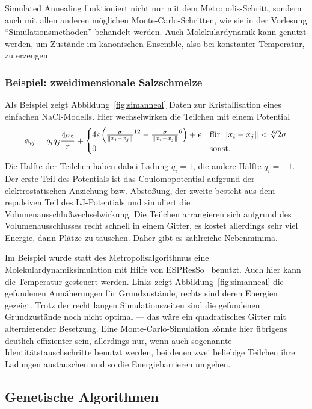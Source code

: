 Simulated Annealing funktioniert nicht nur mit dem
Metropolis-Schritt, sondern auch mit allen anderen möglichen
Monte-Carlo-Schritten, wie sie in der Vorlesung
"`Simulationsmethoden"' behandelt werden. Auch Molekulardynamik kann
genutzt werden, um Zustände im kanonischen Ensemble, also bei
konstanter Temperatur, zu erzeugen.

\subsubsection{Beispiel: zweidimensionale Salzschmelze}
Als Beispiel zeigt Abbildung~\ref{fig:simanneal} Daten zur
Kristallisation eines einfachen NaCl-Modells. Hier wechselwirken die
Teilchen mit einem Potential
\begin{equation}
  \phi_{ij} = q_iq_j\frac{4\sigma\epsilon}{r}  +
  \begin{cases}
    4\epsilon\left(\frac{\sigma}{\left\lVert{x_i-x_j}\right\rVert}^{12} -
      \frac{\sigma}{\left\lVert{x_i-x_j}\right\rVert}^{6}\right) + \epsilon
    & \text{für}\; \left\lVert{x_i-x_j}\right\rVert < \sqrt[6]{2}\sigma\\
    0 & \text{sonst}.
  \end{cases}
\end{equation}
Die Hälfte der Teilchen haben dabei Ladung $q_i=1$, die andere Hälfte
$q_i=-1$. Der erste Teil des Potentials ist das Coulombpotential
aufgrund der elektrostatischen Anziehung bzw. Abstoßung, der zweite
besteht aus dem repulsiven Teil des LJ-Potentials und simuliert die
Volumenausschlußwechselwirkung. Die Teilchen arrangieren sich aufgrund
des Volumenausschlusses recht schnell in einem Gitter, es kostet
allerdings sehr viel Energie, dann Plätze zu tauschen. Daher gibt es
zahlreiche Nebenminima.

Im Beispiel wurde statt des Metropolisalgorithmus eine
Molekulardynamiksimulation mit Hilfe von ESPResSo~\cite{espresso}
benutzt. Auch hier kann die Temperatur gesteuert werden. Links zeigt
Abbildung~\ref{fig:simanneal} die gefundenen Annäherungen für
Grundzustände, rechts sind deren Energien gezeigt. Trotz der recht
langen Simulationszeiten sind die gefundenen Grundzustände noch nicht
optimal --- das wäre ein quadratisches Gitter mit alternierender
Besetzung. Eine Monte-Carlo-Simulation könnte hier übrigens deutlich
effizienter sein, allerdings nur, wenn auch sogenannte
Identitätstauschschritte benutzt werden, bei denen zwei beliebige
Teilchen ihre Ladungen austauschen und so die Energiebarrieren
umgehen.

\subsection{Genetische Algorithmen}

